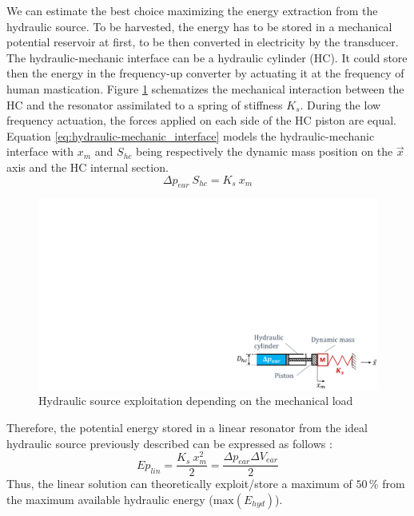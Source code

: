 \documentclass[3p,twocolumn,preprint]{elsarticle}
\begin{document}
We can estimate the best choice maximizing the energy extraction from the hydraulic source. To be harvested, the energy has to be stored in a mechanical potential reservoir at first, to be then converted in electricity by the transducer. The hydraulic-mechanic interface can be a hydraulic cylinder (HC). It could store then the energy in the frequency-up converter by actuating it at the frequency of human mastication. Figure \ref{fig:hydraulic_mechanic_interface} schematizes the mechanical interaction between the HC and the resonator assimilated to a spring of stiffness $K_s$. During the low frequency actuation, the forces applied on each side of the HC piston are equal. Equation \ref{eq:hydraulic-mechanic_interface} models the hydraulic-mechanic interface with $x_{m}$ and $ S_{hc}$ being respectively the dynamic mass position on the $\vec{x}$ axis and the HC internal section.
\begin{equation}
	\Delta p_{ear}\ S_{hc} = K_{s}\ x_{m}
	\label{eq:hydraulic-mechanic_interface}
\end{equation}
\begin{figure}[!htbp]
	\centering
	\captionsetup{justification=centering}
	\includegraphics[trim={19.7cm 0cm 0cm 13cm},clip, width=0.7\linewidth]{figures/hydraulic_mechanic_interface.pdf}
	\caption{Hydraulic source exploitation depending on the mechanical load}
	\label{fig:hydraulic_mechanic_interface}
\end{figure}
Therefore, the potential energy stored in a linear resonator from the ideal hydraulic source previously described can be expressed as follows :
\begin{equation}
	Ep_{lin} = \dfrac{K_s\ x_{m}^2}{2} = \dfrac{\Delta p_{ear} \Delta V_{ear}}{2}
	\label{eq:best_linear_soution}
\end{equation}
Thus, the linear solution can theoretically exploit/store a maximum of $50\,\%$ from the maximum available hydraulic energy ($\text{max}(E_{hyd})$). 
\end{document}
